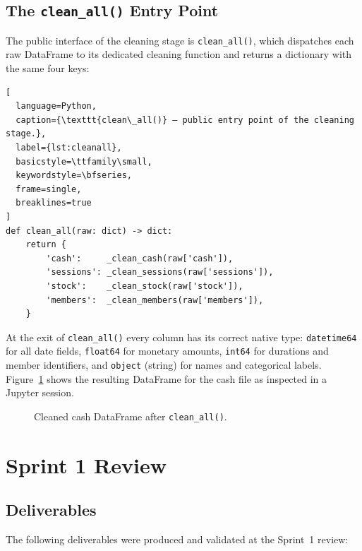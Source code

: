\subsection{The \texttt{clean\_all()} Entry Point}

The public interface of the cleaning stage is \texttt{clean\_all()}, which
dispatches each raw DataFrame to its dedicated cleaning function and returns a
dictionary with the same four keys:

\begin{lstlisting}[
  language=Python,
  caption={\texttt{clean\_all()} — public entry point of the cleaning stage.},
  label={lst:cleanall},
  basicstyle=\ttfamily\small,
  keywordstyle=\bfseries,
  frame=single,
  breaklines=true
]
def clean_all(raw: dict) -> dict:
    return {
        'cash':     _clean_cash(raw['cash']),
        'sessions': _clean_sessions(raw['sessions']),
        'stock':    _clean_stock(raw['stock']),
        'members':  _clean_members(raw['members']),
    }
\end{lstlisting}

At the exit of \texttt{clean\_all()} every column has its correct native type:
\texttt{datetime64} for all date fields, \texttt{float64} for monetary amounts,
\texttt{int64} for durations and member identifiers, and \texttt{object} (string)
for names and categorical labels. Figure~\ref{fig:cleaned_df} shows the resulting
DataFrame for the cash file as inspected in a Jupyter session.

\begin{figure}[H]
  \centering
  \caption{Cleaned cash DataFrame after \texttt{clean\_all()}.}
  \label{fig:cleaned_df}
\end{figure}

\section{Sprint 1 Review}

\subsection{Deliverables}

The following deliverables were produced and validated at the Sprint~1 review:

